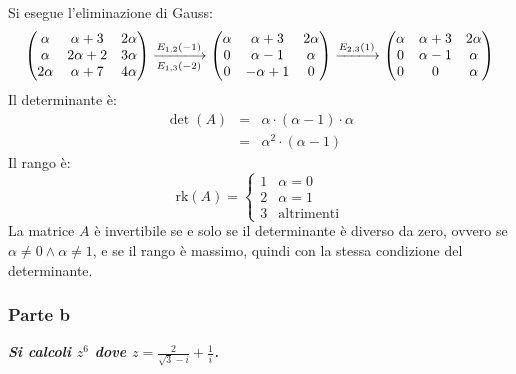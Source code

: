 \documentclass[a4paper]{article}
\begin{document}
	\noindent
	Si esegue l'eliminazione di Gauss:
	\begin{equation*}
		\begin{pmatrix}
			\alpha	& \alpha+3	& 2\alpha	\\
			\alpha	& 2\alpha+2	& 3\alpha	\\
			2\alpha	& \alpha+7	& 4\alpha	
		\end{pmatrix}
		\xlongrightarrow[E_{1,3}\left(-2\right)]{E_{1,2}\left(-1\right)}
		\begin{pmatrix}
			\alpha	& \alpha+3	& 2\alpha	\\
			0		& \alpha-1	&  \alpha	\\
			0		& -\alpha+1	& 0	
		\end{pmatrix}
		\xlongrightarrow{E_{2,3}\left(1\right)}
		\begin{pmatrix}
			\alpha	& \alpha+3	& 2\alpha	\\
			0		& \alpha-1	& \alpha	\\
			0		& 0			& \alpha	
		\end{pmatrix}
	\end{equation*}
	Il determinante è:
	\begin{equation*}
		\begin{array}{rll}
			\det\left(A\right) &=& \alpha \cdot \left(\alpha -1\right) \cdot \alpha \\
			&=& \alpha^{2} \cdot \left(\alpha-1\right)
		\end{array}
	\end{equation*}
	Il rango è:
	\begin{equation*}
		\mathrm{rk}\left(A\right) = \begin{cases}
			1	& \alpha = 0 \\
			2	& \alpha = 1 \\
			3	& \text{altrimenti}
		\end{cases}
	\end{equation*}
	La matrice $A$ è invertibile se e solo se il determinante è diverso da zero, ovvero se $\alpha \ne 0 \land \alpha \ne 1$, e se il rango è massimo, quindi con la stessa condizione del determinante.\newpage

	\subsubsection{Parte b}

	\textcolor{Green4}{\textbf{\emph{Si calcoli $z^{6}$ dove $z = \frac{2}{\sqrt{3}-i}+\frac{1}{i}$.}}}\newline
\end{document}
